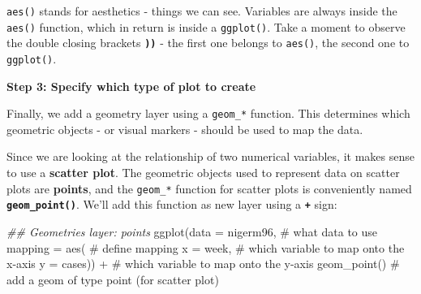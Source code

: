 \documentclass[
  letterpaper,
  DIV=11,
  numbers=noendperiod]{scrreprt}
\newenvironment{Shaded}{\begin{snugshade}}{\end{snugshade}}
\newcommand{\AttributeTok}[1]{\textcolor[rgb]{0.40,0.45,0.13}{#1}}
\newcommand{\CommentTok}[1]{\textcolor[rgb]{0.37,0.37,0.37}{#1}}
\newcommand{\DocumentationTok}[1]{\textcolor[rgb]{0.37,0.37,0.37}{\textit{#1}}}
\newcommand{\FunctionTok}[1]{\textcolor[rgb]{0.28,0.35,0.67}{#1}}
\newcommand{\NormalTok}[1]{\textcolor[rgb]{0.00,0.23,0.31}{#1}}
\newcommand{\SpecialCharTok}[1]{\textcolor[rgb]{0.37,0.37,0.37}{#1}}
\begin{document}
\begin{tcolorbox}[enhanced jigsaw, colframe=quarto-callout-note-color-frame, colbacktitle=quarto-callout-note-color!10!white, titlerule=0mm, opacitybacktitle=0.6, breakable, toprule=.15mm, arc=.35mm, rightrule=.15mm, colback=white, bottomrule=.15mm, opacityback=0, toptitle=1mm, left=2mm, bottomtitle=1mm, title=\textcolor{quarto-callout-note-color}{\faInfo}\hspace{0.5em}{Key Point}, leftrule=.75mm, coltitle=black]

\texttt{aes()} stands for aesthetics - things we can see. Variables are
always inside the \texttt{aes()} function, which in return is inside a
\texttt{ggplot()}. Take a moment to observe the double closing brackets
\textbf{\texttt{))}} - the first one belongs to \texttt{aes()}, the
second one to \texttt{ggplot()}.

\end{tcolorbox}

\textbf{Step 3: Specify which type of plot to create}

Finally, we add a geometry layer using a \texttt{geom\_*} function. This
determines which geometric objects - or visual markers - should be used
to map the data.

Since we are looking at the relationship of two numerical variables, it
makes sense to use a \textbf{scatter plot}. The geometric objects used
to represent data on scatter plots are \textbf{points}, and the
\texttt{geom\_*} function for scatter plots is conveniently named
\textbf{\texttt{geom\_point()}}. We'll add this function as new layer
using a \textbf{\texttt{+}} sign:

\begin{Shaded}
\begin{Highlighting}[]
\DocumentationTok{\#\# Geometries layer: points}
\FunctionTok{ggplot}\NormalTok{(}\AttributeTok{data =}\NormalTok{ nigerm96, }\CommentTok{\# what data to use}
       \AttributeTok{mapping =} \FunctionTok{aes}\NormalTok{(   }\CommentTok{\# define mapping}
         \AttributeTok{x =}\NormalTok{ week,      }\CommentTok{\# which variable to map onto the x{-}axis}
         \AttributeTok{y =}\NormalTok{ cases)) }\SpecialCharTok{+}  \CommentTok{\# which variable to map onto the y{-}axis}
  \FunctionTok{geom\_point}\NormalTok{()          }\CommentTok{\# add a geom of type \textasciigrave{}point\textasciigrave{} (for scatter plot)}
\end{Highlighting}
\end{Shaded}
\end{document}
